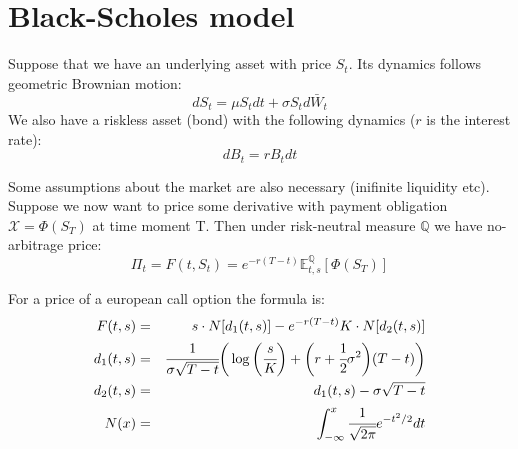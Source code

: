 \documentclass[a4paper, 12pt]{article}
\theoremstyle{problemstyle}
\newcommand{\E}{\mathbb{E}}
\begin{document}
\section{Black-Scholes model}
Suppose that we have an underlying asset with price $S_t$. Its dynamics follows geometric Brownian motion:
$$
dS_t = \mu S_tdt + \sigma S_t d\bar{W}_t
$$
We also have a riskless asset (bond) with the following dynamics ($r$ is the interest rate):
$$
dB_t = rB_tdt
$$


 Some assumptions about the market are also necessary (inifinite liquidity etc). 
Suppose we now want to price some derivative with payment obligation $\mathcal{X} = \Phi(S_T)$ at time moment T. Then under risk-neutral measure $\mathbb{Q}$ we have no-arbitrage price:
$$
\Pi_t = F(t, S_t) = e^{-r(T-t)}\E^{\mathbb{Q}}_{t, s} [\Phi(S_T)]
$$

For a price of a  european call option the formula is:
\begin{eqnarray}
F(t, s) &=& s \cdot N[d_1(t, s)] - e^{-r(T-t)}K \cdot N[d_2(t, s)] \\
d_1(t, s) &=&  \cfrac{1}{\sigma\sqrt{T-t} }
	\bigg( 
	\log\bigg(\cfrac{s}{K}\bigg) + \bigg( r + \cfrac{1}{2} \sigma^2 \bigg)(T-t) 
	\bigg) \\
d_2(t, s) &=& d_1(t, s) - \sigma \sqrt{T-t} \\
N(x) &=& \int_{-\infty}^{x} \cfrac{1}{\sqrt{2\pi}} e^{-t^2/2}dt
\end{eqnarray}
\end{document}
